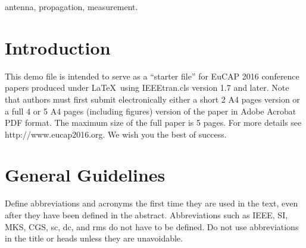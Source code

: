 \documentclass{article}
\begin{document}
\begin{abstract}
This electronic document is a  live  template and already defines the components of your paper [title, text, heads, etc.] in its style sheet. \em{*CRITICAL:  Do Not Use Symbols, Special Characters, or Math in Paper Title or Abstract}. 
\end{abstract}

{\smallskip \keywords antenna, propagation, measurement.}



%
\IEEEpeerreviewmaketitle

\vspace{7pt}
\section{Introduction}
This demo file is intended to serve as a ``starter file''
for EuCAP 2016 conference papers produced under \LaTeX\ using
IEEEtran.cls version 1.7 and later.
Note that authors must first submit electronically either a short 2 A4 pages version or a full 4 or 5 A4 pages (including figures) version of the paper in Adobe Acrobat PDF format. The maximum size of the full paper is 5 pages. For more details see http://www.eucap2016.org. We wish you the best of success.

\vspace{7pt}
\section{General Guidelines}
Define abbreviations and acronyms the first time they are used in the text, even after they have been defined in the abstract. Abbreviations such as IEEE, SI, MKS, CGS, sc, dc, and rms do not have to be defined. Do not use abbreviations in the title or heads unless they are unavoidable.
\end{document}
